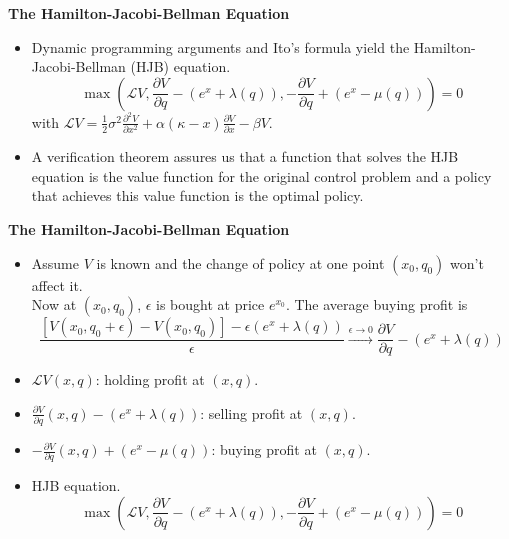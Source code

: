 \documentclass{beamer}
\begin{document}
\begin{frame}
{\bf The Hamilton-Jacobi-Bellman Equation}
\begin{itemize}
  \item Dynamic programming arguments and Ito's formula yield the Hamilton-Jacobi-Bellman (HJB) equation.
  \begin{equation*}
  \max\left( \mathcal{L} V, \frac{\partial V}{\partial q} - (e^x + \lambda(q)), -\frac{\partial V}{\partial q} + (e^x - \mu(q))\right) = 0
\end{equation*}
with $\mathcal{L}V = \frac{1}{2} \sigma^2 \frac{\partial^2 V}{\partial x^2} + \alpha (\kappa - x) \frac{\partial V}{\partial x} - \beta V$.


  \item A verification theorem assures us that a function that solves the HJB equation is the value function for the original control problem and a policy that achieves this value function is the optimal policy.

\end{itemize}

\end{frame}

\begin{frame}
{\bf The Hamilton-Jacobi-Bellman Equation}

\begin{itemize}
\item Assume $V$ is known and the change of policy at one point $(x_0,q_0)$ won't affect it.\\
Now at $(x_0,q_0)$, $\epsilon$ is bought at price $e^{x_0}$. The average buying profit is 
\begin{equation*}
  \frac{\left[V(x_0,q_0 + \epsilon) - V(x_0,q_0)\right] - \epsilon(e^x + \lambda(q))}{\epsilon}
  \stackrel{\epsilon \rightarrow 0}{\longrightarrow} 
  \frac{\partial V}{\partial q} - (e^x + \lambda(q))
\end{equation*}

\item $\mathcal{L}V(x,q)$: holding profit at $(x,q)$.
\item $\frac{\partial V}{\partial q}(x,q) - (e^x + \lambda(q))$: selling profit at $(x,q)$.
\item $-\frac{\partial V}{\partial q}(x,q) + (e^x - \mu(q))$: buying profit at $(x,q)$.

\item HJB equation.
\begin{equation*}
  \max\left( \mathcal{L} V, \frac{\partial V}{\partial q} - (e^x + \lambda(q)), -\frac{\partial V}{\partial q} + (e^x - \mu(q))\right) = 0
\end{equation*}



\end{itemize}

\end{frame}
\end{document}
